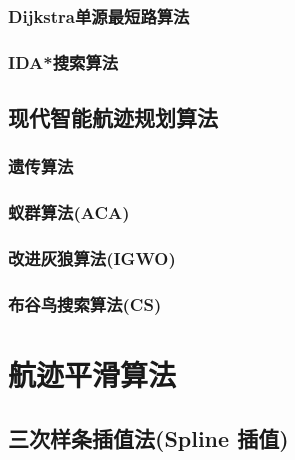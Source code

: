 \documentclass[12pt,a4paper,oneside,UTF8]{ctexart}
\begin{document}
\subsubsection{Dijkstra单源最短路算法}
\subsubsection{IDA*搜索算法}
\subsection{现代智能航迹规划算法}
\subsubsection{遗传算法}
\subsubsection{蚁群算法(ACA)}
\subsubsection{改进灰狼算法(IGWO)}
\subsubsection{布谷鸟搜索算法(CS)}
\newpage\section{航迹平滑算法}
\subsection{三次样条插值法(Spline 插值)}
\end{document}

